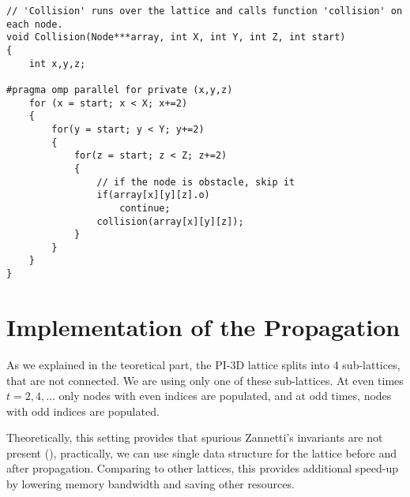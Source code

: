 \begin{lstlisting}
// 'Collision' runs over the lattice and calls function 'collision' on each node. 
void Collision(Node***array, int X, int Y, int Z, int start)
{
	int x,y,z;

#pragma omp parallel for private (x,y,z)
	for (x = start; x < X; x+=2)
	{
		for(y = start; y < Y; y+=2)
		{
			for(z = start; z < Z; z+=2)
			{
				// if the node is obstacle, skip it
				if(array[x][y][z].o)
					continue;
				collision(array[x][y][z]);
			}
		}
	}
}
\end{lstlisting}


\section{Implementation of the Propagation}


As we explained in the teoretical part, the PI-3D lattice splits into 4 sub-lattices, that are not connected. We are using only one of these sub-lattices. At even times $t=2,4,...$ only nodes with even indices are populated, and at odd times, nodes with odd indices are populated.

Theoretically, this setting provides that spurious Zannetti's invariants are not present (\cite{nasilowski}), practically, we can use single data structure for the lattice before and after propagation. Comparing to other lattices, this provides additional speed-up by lowering memory bandwidth and saving other resources.

